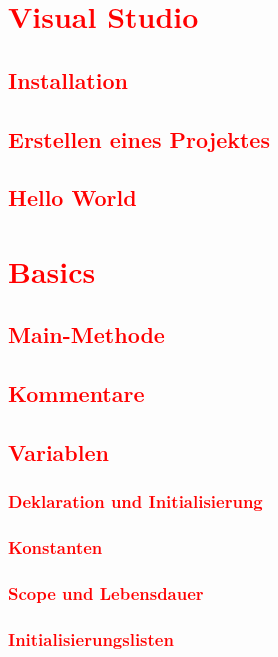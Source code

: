 \cleardoublepage\chapter{\textcolor{red}{Visual Studio}}\label{chap:visual-studio}
\section{\textcolor{red}{Installation}}\label{sec:installation}
\section{\textcolor{red}{Erstellen eines Projektes}}\label{sec:create-project}
\section{\textcolor{red}{Hello World}}\label{sec:hello-world}

\cleardoublepage\chapter{\textcolor{red}{Basics}}\label{chap:basics}
\section{\textcolor{red}{Main-Methode}}\label{sec:main-method}
\section{\textcolor{red}{Kommentare}}\label{sec:comments}
\section{\textcolor{red}{Variablen}}\label{sec:variables}
\subsection{\textcolor{red}{Deklaration und Initialisierung}}\label{sec:declaration-initialization}
\subsection{\textcolor{red}{Konstanten}}\label{sec:constants}
\subsection{\textcolor{red}{Scope und Lebensdauer}}\label{sec:scope-lifetime}
\subsection{\textcolor{red}{Initialisierungslisten}}\label{sec:initializer-lists}
